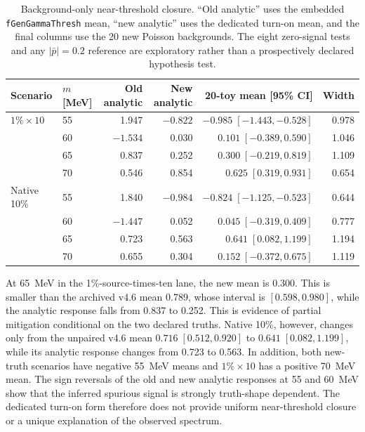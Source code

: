 \begin{table}[p]
\centering
\caption{Background-only near-threshold closure.  ``Old analytic'' uses the
embedded \texttt{fGenGammaThresh} mean, ``new analytic'' uses the dedicated
turn-on mean, and the final columns use the 20 new Poisson backgrounds.  The
eight zero-signal tests and any $|\bar p|=0.2$ reference are exploratory rather
than a prospectively declared hypothesis test.}
\label{tab:v4p7-zero-signal-results}
\small
\begin{tabular}{llrrrr}
\toprule
Scenario & $m$ [MeV] & Old analytic & New analytic & 20-toy mean [95\% CI] & Width \\
\midrule
$1\%\times10$ & 55 &  1.947 & $-0.822$ & $-0.985\;[-1.443,-0.528]$ & 0.978 \\
                & 60 & $-1.534$ &  0.030 & $ 0.101\;[-0.389, 0.590]$ & 1.046 \\
                & 65 &  0.837 &  0.252 & $ 0.300\;[-0.219, 0.819]$ & 1.109 \\
                & 70 &  0.546 &  0.854 & $ 0.625\;[ 0.319, 0.931]$ & 0.654 \\
Native 10\%     & 55 &  1.840 & $-0.984$ & $-0.824\;[-1.125,-0.523]$ & 0.644 \\
                & 60 & $-1.447$ &  0.052 & $ 0.045\;[-0.319, 0.409]$ & 0.777 \\
                & 65 &  0.723 &  0.563 & $ 0.641\;[ 0.082, 1.199]$ & 1.194 \\
                & 70 &  0.655 &  0.304 & $ 0.152\;[-0.372, 0.675]$ & 1.119 \\
\bottomrule
\end{tabular}
\end{table}

At 65~MeV in the 1\%-source-times-ten lane, the new mean is 0.300.  This is
smaller than the archived v4.6 mean 0.789, whose interval is
$[0.598,0.980]$, while the analytic response falls from 0.837 to 0.252.  This
is evidence of partial mitigation conditional on the two declared truths.
Native 10\%, however, changes only from the unpaired v4.6
mean $0.716\;[0.512,0.920]$ to $0.641\;[0.082,1.199]$, while its analytic
response changes from 0.723 to 0.563.  In addition, both new-truth scenarios
have negative 55~MeV means and $1\%\times10$ has a positive 70~MeV mean.
The sign reversals of the old and new analytic responses at 55 and 60~MeV
show that the inferred spurious signal is strongly truth-shape dependent.
The dedicated turn-on form therefore does not provide uniform near-threshold
closure or a unique explanation of the observed spectrum.

